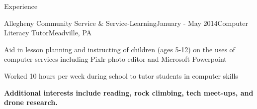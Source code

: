 \documentclass{resume} %
\begin{document}
\begin{rSection}{Experience}

\begin{rSubsection}{Allegheny Community Service \& Service-Learning}{January - May 2014}{Computer Literacy Tutor}{Meadville, PA}
\item Aid in lesson planning and instructing of children (ages 5-12) on the uses of computer services including Pixlr photo editor and Microsoft Powerpoint
\item Worked 10 hours per week during school to tutor students in computer skills
\end{rSubsection}

\vspace{5mm}
\textbf{Additional interests include reading, rock climbing, tech meet-ups, and drone research.}




\end{rSection}



\end{document}
